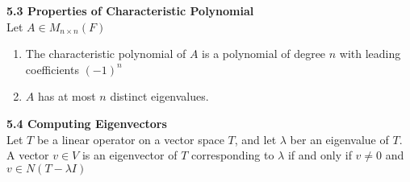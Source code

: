 \documentclass[11pt]{article}
\begin{document}
\begin{theorem*}
    \textbf{5.3 Properties of Characteristic Polynomial} \\
    Let $A\in M_{n\times n}(F)$
    \begin{enumerate}
        \item The characteristic polynomial of $A$ is a polynomial of degree $n$ with leading coefficients $(-1)^n$
        \item $A$ has at most $n$ distinct eigenvalues. 
    \end{enumerate}
\end{theorem*}

\begin{theorem*}
    \textbf{5.4 Computing Eigenvectors} \\
    Let $T$ be a linear operator on a vector space $T$, and let $\lambda$ ber an eigenvalue of $T$. A vector $v\in V$ is an eigenvector of $T$ corresponding to $\lambda$ if and only if $v\neq 0$ and $v\in N(T-\lambda I)$
\end{theorem*}
\end{document}
